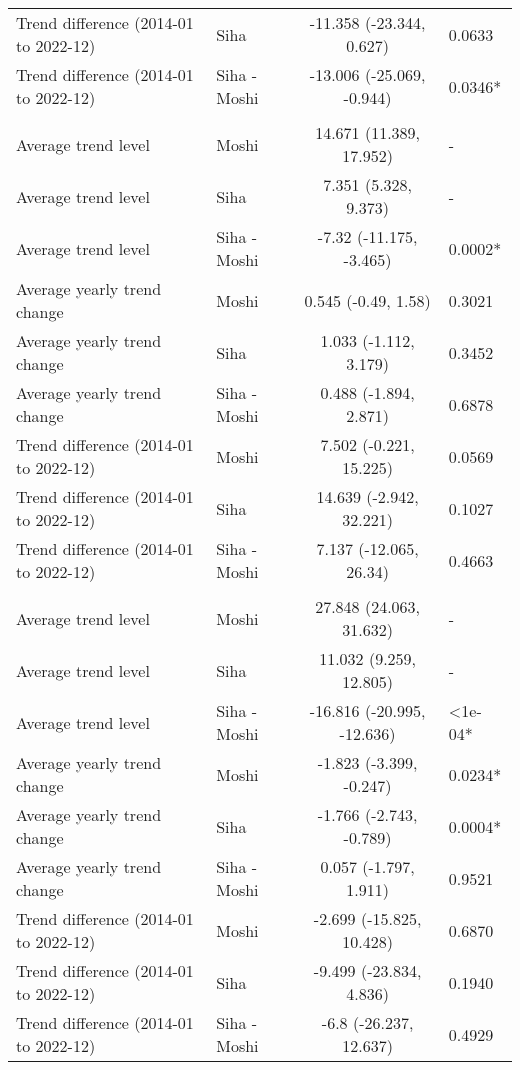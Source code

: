 \begin{longtable}{l|lcl}
Trend difference (2014-01 to 2022-12) & Siha & -11.358 (-23.344, 0.627) & 0.0633 \\ 
Trend difference (2014-01 to 2022-12) & Siha - Moshi & -13.006 (-25.069, -0.944) & 0.0346* \\ 
\midrule\addlinespace[2.5pt]
\multicolumn{4}{l}{Substance Abuse} \\[2.5pt] 
\midrule\addlinespace[2.5pt]
Average trend level & Moshi & 14.671 (11.389, 17.952) & - \\ 
Average trend level & Siha & 7.351 (5.328, 9.373) & - \\ 
Average trend level & Siha - Moshi & -7.32 (-11.175, -3.465) & 0.0002* \\ 
Average yearly trend change & Moshi & 0.545 (-0.49, 1.58) & 0.3021 \\ 
Average yearly trend change & Siha & 1.033 (-1.112, 3.179) & 0.3452 \\ 
Average yearly trend change & Siha - Moshi & 0.488 (-1.894, 2.871) & 0.6878 \\ 
Trend difference (2014-01 to 2022-12) & Moshi & 7.502 (-0.221, 15.225) & 0.0569 \\ 
Trend difference (2014-01 to 2022-12) & Siha & 14.639 (-2.942, 32.221) & 0.1027 \\ 
Trend difference (2014-01 to 2022-12) & Siha - Moshi & 7.137 (-12.065, 26.34) & 0.4663 \\ 
\midrule\addlinespace[2.5pt]
\multicolumn{4}{l}{Tuberculosis} \\[2.5pt] 
\midrule\addlinespace[2.5pt]
Average trend level & Moshi & 27.848 (24.063, 31.632) & - \\ 
Average trend level & Siha & 11.032 (9.259, 12.805) & - \\ 
Average trend level & Siha - Moshi & -16.816 (-20.995, -12.636) & <1e-04* \\ 
Average yearly trend change & Moshi & -1.823 (-3.399, -0.247) & 0.0234* \\ 
Average yearly trend change & Siha & -1.766 (-2.743, -0.789) & 0.0004* \\ 
Average yearly trend change & Siha - Moshi & 0.057 (-1.797, 1.911) & 0.9521 \\ 
Trend difference (2014-01 to 2022-12) & Moshi & -2.699 (-15.825, 10.428) & 0.6870 \\ 
Trend difference (2014-01 to 2022-12) & Siha & -9.499 (-23.834, 4.836) & 0.1940 \\ 
Trend difference (2014-01 to 2022-12) & Siha - Moshi & -6.8 (-26.237, 12.637) & 0.4929 \\ 

\end{longtable}
